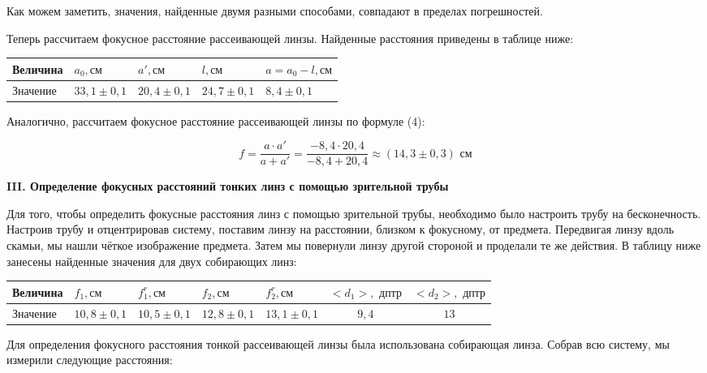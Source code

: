 \documentclass[a4paper,12pt]{report}
\begin{document}
Как можем заметить, значения, найденные двумя разными способами, совпадают в пределах погрешностей.

Теперь рассчитаем фокусное расстояние рассеивающей линзы. Найденные расстояния приведены в таблице ниже: 
\begin{table}[h!]
\centering
\begin{tabular}{|l|l|l|l|l|}
\hline
Величина & $a_{0},  \text{см}$           & $a',  \text{см}$           & $l,  \text{см}$            & $a=a_{0}-l,  \text{см}$      \\ \hline
Значение & $33,1\pm0,1$ & $20,4\pm0,1$ & $24,7\pm0,1$ & $8,4\pm0,1$ \\ \hline
\end{tabular}
\end{table}

Аналогично, рассчитаем фокусное расстояние рассеивающей линзы по формуле (4):

\begin{equation*}
    f = \frac{a\cdot a'}{a + a'} = \frac{-8,4 \cdot 20,4}{-8,4 + 20,4} \approx (14,3 \pm 0,3)\text{ см}
\end{equation*}

\vspace{\baselineskip}
\noindent\textbf{III. Определение фокусных расстояний тонких линз с помощью
зрительной трубы}

Для того, чтобы определить фокусные расстояния линз с помощью зрительной трубы, необходимо было настроить трубу на бесконечность. Настроив трубу и отцентрировав систему, поставим линзу на расстоянии, близком к фокусному, от предмета. Передвигая линзу вдоль скамьи, мы нашли чёткое изображение предмета. Затем мы повернули линзу другой стороной и проделали те же действия. В таблицу ниже занесены найденные значения для двух собирающих линз: 

\begin{table}[h!]
\centering
\begin{tabular}{|l|l|l|l|l|c|c|}
\hline
Величина & $f_{1},  \text{см}$ & $f_{1}^{r},  \text{см}$ & $f_{2},  \text{см}$ & $f_{2}^{r},  \text{см}$ & $<d_{1}>, \text{ дптр}$ & $<d_{2}>, \text{ дптр}$\\ \hline
Значение & $10,8\pm0,1$ & $10,5\pm0,1$  & $12,8\pm0,1$ & $13,1\pm0,1$ & $9,4$ & $13$ \\ \hline
\end{tabular}
\end{table}

\newpage
Для определения фокусного расстояния тонкой рассеивающей линзы была использована собирающая линза. Собрав всю систему, мы измерили следующие расстояния:
\end{document}
